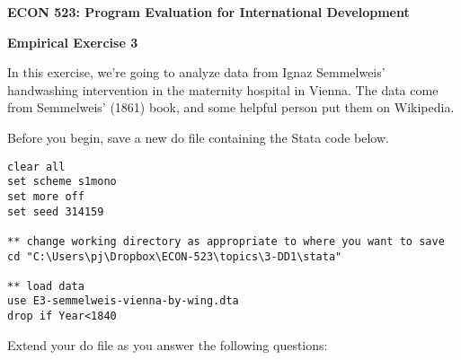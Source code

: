 \documentclass[11pt]{article}
\begin{document}
\begin{center}

\textbf{\large{ECON 523:  Program Evaluation for International Development}} \\

\medskip

\textbf{\large{Empirical Exercise 3}} \\ 

\end{center}

\bigskip

\bigskip

\noindent
In this exercise, we're going to analyze data from Ignaz Semmelweis' handwashing
intervention in the maternity hospital in Vienna.  The data come from 
Semmelweis' (1861) book, and some helpful person put them on Wikipedia.

\medskip

\noindent
Before you begin, save a new do file containing the Stata code below.  

\begin{verbatim}
clear all 
set scheme s1mono 
set more off
set seed 314159

** change working directory as appropriate to where you want to save
cd "C:\Users\pj\Dropbox\ECON-523\topics\3-DD1\stata"

** load data
use E3-semmelweis-vienna-by-wing.dta
drop if Year<1840
\end{verbatim}

\noindent
Extend your do file as you answer the following questions: 
\end{document}
